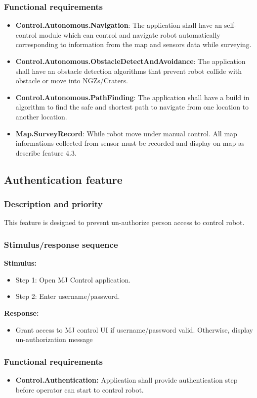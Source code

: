 \documentclass[10pt,a4paper,titlepage]{article}
\begin{document}
	\subsubsection{Functional requirements}
	\begin{itemize}
		\item \textbf{Control.Autonomous.Navigation}: The application shall have an self-control module which can control and navigate robot automatically corresponding to information from the map and sensors data while surveying.
		\item \textbf{Control.Autonomous.ObstacleDetectAndAvoidance}: The application shall have an obstacle detection algorithms that prevent robot collide with obstacle or move into NGZs/Craters.
		\item \textbf{Control.Autonomous.PathFinding}: The application shall have a build in algorithm to find the safe and shortest path to navigate from one location to another location.
		\item \textbf{Map.SurveyRecord}: While robot move under manual control. All map informations collected from sensor must be recorded and display on map as describe feature 4.3.
	\end{itemize}
 
 
	 \subsection{Authentication feature }
	 \subsubsection{Description and priority}
	 \text This feature is designed to prevent un-authorize person access to control robot.
	 \subsubsection{Stimulus/response sequence}
	 \textbf{Stimulus:}
	 \begin{itemize}
	 	\item Step 1: Open MJ Control application.
	 	\item Step 2: Enter username/password.
	 \end{itemize}
	 \textbf{Response:}
	\begin{itemize}
		\item Grant access to MJ control UI if username/password valid. Otherwise, display un-authorization message
	\end{itemize}
	 \subsubsection{Functional requirements}
	 \begin{itemize}
	 	\item \textbf{Control.Authentication:}  Application shall provide authentication step before operator can start to control robot.
	 \end{itemize}
	
\end{document}
